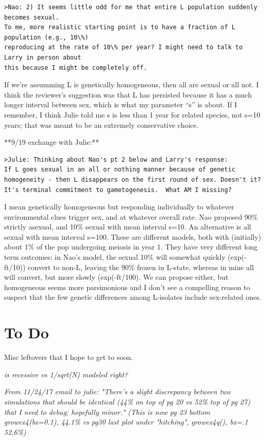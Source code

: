 \documentclass{article}\usepackage[]{graphicx}\usepackage[]{color}
\begin{document}
\begin{verbatim}
>Nao: 2) It seems little odd for me that entire L population suddenly becomes sexual. 
To me, more realistic starting point is to have a fraction of L population (e.g., 10\%) 
reproducing at the rate of 10\% per year? I might need to talk to Larry in person about 
this because I might be completely off.
\end{verbatim}

If we’re assumming L is genetically homogeneous, then all are sexual or all not.  I think the
reviewer’s suggestion was that L has persisted because it has a much longer interval between sex,
which is what my parameter “s” is about.  If I remember, I think Julie told me s is less than 1 year
for related species, not s=10 years; that was meant to be an extremely conservative choice.

**9/19 exchange with Julie:**

\begin{verbatim}
>Julie: Thinking about Nao's pt 2 below and Larry's response:
If L goes sexual in an all or nothing manner because of genetic
homogeneity - then L disappears on the first round of sex. Doesn't it?
It's terminal commitment to gametogenesis.  What AM I missing? 
\end{verbatim}

I mean genetically homogeneous but responding individually to whatever environmental clues trigger
sex, and at whatever overall rate.  Nao proposed 90\% strictly asexual, and 10\% sexual with mean
interval s=10.  An alternative is all sexual with mean interval s=100.  These are different models,
both with (initially) about 1\% of the pop undergoing meiosis in year 1.  They have very different
long term outcomes: in Nao's model, the sexual 10\% will somewhat quickly (exp(-ft/10)) convert to
non-L, leaving the 90\% frozen in L-state, whereas in mine all will convert, but more slowly
(exp(-ft/100).  We can propose either, but homogeneous seems more parsimonious and I don’t see a
compelling reason to suspect that the few genetic differences among L-isolates include sex-related
ones.


\section{To Do} 

Misc leftovers that I hope to get to soon.

\textit{is recessive vs 1/sqrt(N) modeled right?}

\textit{From 11/24/17 email to julie: "There’s a slight discrepancy between two simulations that
  should be identical (44\% on top of pg 20 vs 52\% top of pg 27) that I need to debug; hopefully
  minor."  (This is now pg 23 bottom growex4(bx=0.1), 44.1\% vs pg30 last plot under "hitching",
  growex4q(), bx=.1 52.6\%)}
\end{document}
